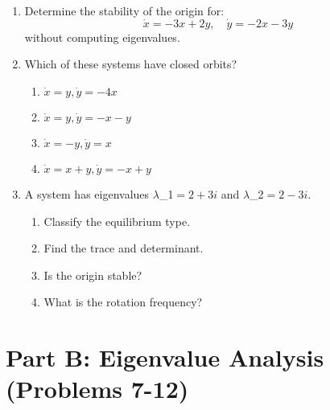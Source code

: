 \documentclass[12pt]{article}
\begin{document}
\begin{enumerate}
\item Determine the stability of the origin for:
$$\dot{x} = -3x + 2y, \quad \dot{y} = -2x - 3y$$
without computing eigenvalues.

\item Which of these systems have closed orbits?
\begin{enumerate}[label=(\alph*)]
    \item $\dot{x} = y, \dot{y} = -4x$
    \item $\dot{x} = y, \dot{y} = -x - y$
    \item $\dot{x} = -y, \dot{y} = x$
    \item $\dot{x} = x + y, \dot{y} = -x + y$
\end{enumerate}

\item A system has eigenvalues $\lambda$_{1}$ = 2 + 3i$ and $\lambda$_{2}$ = 2 - 3i$.
\begin{enumerate}[label=(\alph*)]
    \item Classify the equilibrium type.
    \item Find the trace and determinant.
    \item Is the origin stable?
    \item What is the rotation frequency?
\end{enumerate}
\end{enumerate}

\section*{Part B: Eigenvalue Analysis (Problems 7-12)}
\end{document}
